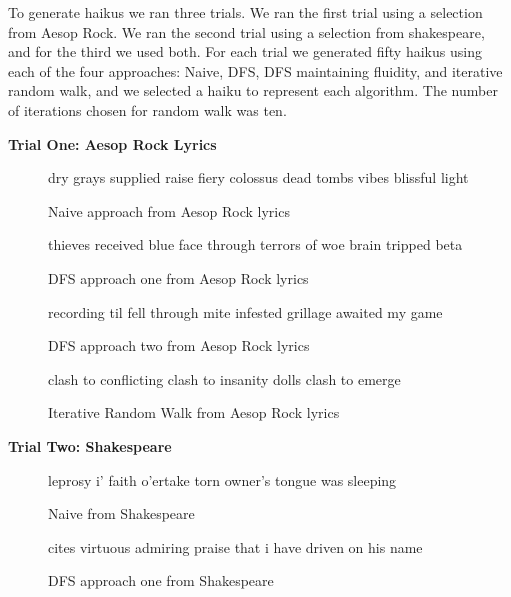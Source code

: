 \documentclass[]{article}
\begin{document}
To generate haikus we ran three trials. We ran the first trial using a selection from Aesop Rock. We ran the second trial using a selection from shakespeare, and for the third we used both. For each trial we generated fifty haikus using each of the four approaches: Naive, DFS, DFS maintaining fluidity, and iterative random walk, and we selected a haiku to represent each algorithm. The number of iterations chosen for random walk was ten.

\begin{center}
\textbf{Trial One: Aesop Rock Lyrics}
\end{center}

\begin{figure}[H]
	\centering
	dry grays supplied raise \break
	fiery colossus dead tombs \break
	vibes blissful light
	\caption{Naive approach from Aesop Rock lyrics}
	\label{fig:NaiveAesop}
\end{figure}

\begin{figure}[H]
	\centering
	thieves received \break
	blue face through terrors of woe \break
	brain tripped beta
	\caption{DFS approach one from Aesop Rock lyrics}
	\label{fig:DFSOneAesop}
\end{figure}

\begin{figure}[H]
	\centering
	recording til fell \break
	through mite infested grillage \break
	awaited my game
	\caption{DFS approach two from Aesop Rock lyrics}
	\label{fig:DFSTwoAesop}
\end{figure}

\begin{figure}[H]
	\centering
	clash to conflicting \break
	clash to insanity dolls \break
	clash to emerge
	\caption{Iterative Random Walk from Aesop Rock lyrics}
		\label{fig:IRWAesop}
	\end{figure}
\begin{center}
\textbf{Trial Two: Shakespeare}
\end{center}

\begin{figure}[H]
	\centering
	leprosy i' faith \break
	o'ertake torn owner's \break
	tongue was sleeping
	\caption{Naive from Shakespeare}
	\label{fig:NaiveShakespeare}
\end{figure}

\begin{figure}[H]
	\centering
	cites virtuous \break
	admiring praise that i have \break
	driven on his name
	\caption{DFS approach one from Shakespeare}
	\label{fig:DPSOneShakespeare}
\end{figure}
\end{document}
